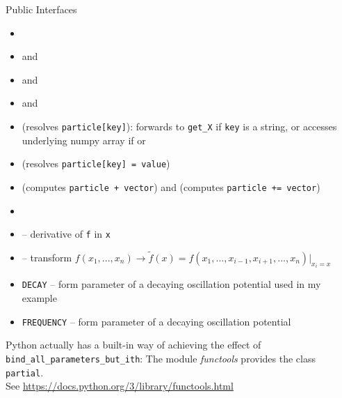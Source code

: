 \begin{frame}[fragile]{Public Interfaces}
%
\begin{defbox}
\begin{itemize}
\item {}
\item {} and 
\item {} and 
\item {} and 
\item {} (resolves \texttt{particle[key]}):
	forwards to \texttt{get\_X} if \texttt{key} is a string, or accesses underlying numpy array if  or 
\item {} (resolves \texttt{particle[key] = value})
\item {} (computes \texttt{particle + vector}) and  (computes \texttt{particle += vector})
\item {}
\end{itemize}
\end{defbox}
%
\end{frame}


\begin{frame}[fragile]
%
\begin{defbox}
\begin{itemize}
\item {} -- derivative of \texttt{f} in \texttt{x}
\item {} -- transform $f(x_1, ..., x_n) \to \tilde{f}(x) = f(x_1, ..., x_{i-1}, x_{i+1}, ..., x_n) |_{x_i = x}$
\end{itemize}
\end{defbox}
%
\begin{defbox}
\begin{itemize}
\item \texttt{DECAY} -- form parameter of a decaying oscillation potential used in my example
\item \texttt{FREQUENCY} -- form parameter of a decaying oscillation potential
\end{itemize}
\end{defbox}
%
\begin{hintbox}
\small
Python actually has a built-in way of achieving the effect of \texttt{bind\_all\_parameters\_but\_ith}: The module \emph{functools} provides the class \texttt{partial}.\\
See \url{https://docs.python.org/3/library/functools.html}
\end{hintbox}
%
\end{frame}

